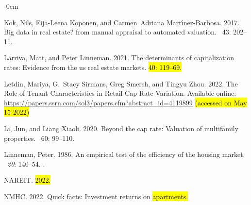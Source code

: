 \documentclass[jrfm,article,accept,oneauthor,pdftex]{Definitions/mdpi}
\begin{document}
\begin{adjustwidth}{-\extralength}{0cm}
\begin{thebibliography}{999}
Kok, Nils, Eija-Leena Koponen, and Carmen~Adriana Mart{\'\i}nez-Barbosa. 2017.
\newblock Big data in real estate? from manual appraisal to automated
  valuation.
~{43\/}:  202--11.

Larriva, Matt, and Peter Linneman. 2021.
\newblock The determinants of capitalization rates: Evidence from the us real
  estate markets.
 \hl{40: 119--69.} %


Letdin, Mariya, G.~Stacy Sirmans, Greg Smersh, and Tingyu Zhou. 2022.
\newblock The Role of Tenant Characteristics in Retail Cap Rate Variation.
 Available online: \url{https://papers.ssrn.com/sol3/papers.cfm?abstract_id=4119899} \hl{(accessed on May 15 2022)} %

Li, Jun, and Liang Xiaoli. 2020.
\newblock Beyond the cap rate: Valuation of multifamily properties.
~{60\/}:
  99--110.

Linneman, Peter. 1986.
\newblock An empirical test of the efficiency of the housing market.
~{\em 20\/}:  140--54.
.

NAREIT. \hl{2022.} %


NMHC. 2022.
\newblock Quick facts: Investment returns on \hl{apartments.} %




\end{thebibliography}
\end{adjustwidth}
\end{document}
